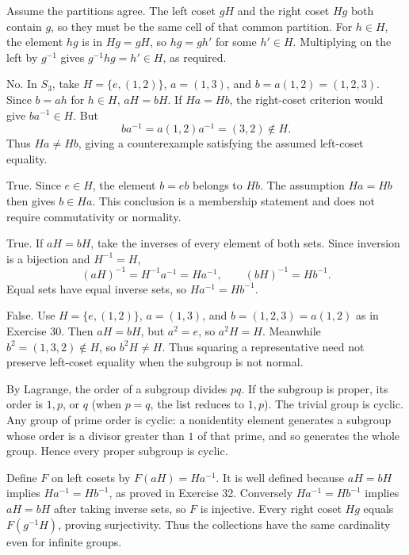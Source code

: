 Assume the partitions agree. The left coset $gH$ and the right coset $Hg$ both contain $g$, so they must be the same cell of that common partition. For $h\in H$, the element $hg$ is in $Hg=gH$, so $hg=gh'$ for some $h'\in H$. Multiplying on the left by $g^{-1}$ gives $g^{-1}hg=h'\in H$, as required.

No. In $S_3$, take $H=\{e,(1,2)\}$, $a=(1,3)$, and $b=a(1,2)=(1,2,3)$. Since $b=ah$ for $h\in H$, $aH=bH$. If $Ha=Hb$, the right-coset criterion would give $ba^{-1}\in H$. But
\[ba^{-1}=a(1,2)a^{-1}=(3,2)\notin H.\]
Thus $Ha\ne Hb$, giving a counterexample satisfying the assumed left-coset equality.

True. Since $e\in H$, the element $b=eb$ belongs to $Hb$. The assumption $Ha=Hb$ then gives $b\in Ha$. This conclusion is a membership statement and does not require commutativity or normality.

True. If $aH=bH$, take the inverses of every element of both sets. Since inversion is a bijection and $H^{-1}=H$,
\[(aH)^{-1}=H^{-1}a^{-1}=Ha^{-1},\qquad (bH)^{-1}=Hb^{-1}.\]
Equal sets have equal inverse sets, so $Ha^{-1}=Hb^{-1}$.

False. Use $H=\{e,(1,2)\}$, $a=(1,3)$, and $b=(1,2,3)=a(1,2)$ as in Exercise 30. Then $aH=bH$, but $a^2=e$, so $a^2H=H$. Meanwhile $b^2=(1,3,2)\notin H$, so $b^2H\ne H$. Thus squaring a representative need not preserve left-coset equality when the subgroup is not normal.

By Lagrange, the order of a subgroup divides $pq$. If the subgroup is proper, its order is $1,p$, or $q$ (when $p=q$, the list reduces to $1,p$). The trivial group is cyclic. Any group of prime order is cyclic: a nonidentity element generates a subgroup whose order is a divisor greater than $1$ of that prime, and so generates the whole group. Hence every proper subgroup is cyclic.

Define $F$ on left cosets by $F(aH)=Ha^{-1}$. It is well defined because $aH=bH$ implies $Ha^{-1}=Hb^{-1}$, as proved in Exercise 32. Conversely $Ha^{-1}=Hb^{-1}$ implies $aH=bH$ after taking inverse sets, so $F$ is injective. Every right coset $Hg$ equals $F(g^{-1}H)$, proving surjectivity. Thus the collections have the same cardinality even for infinite groups.

